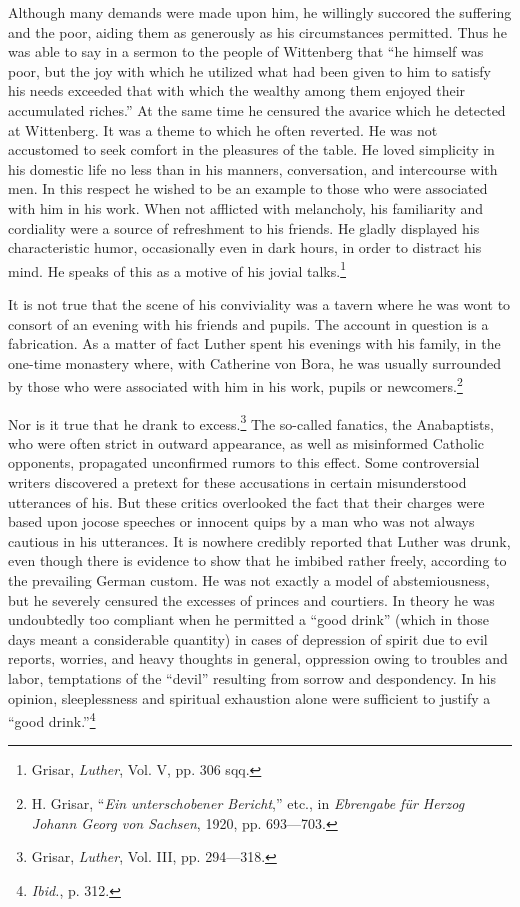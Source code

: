 Although many demands were made upon him, he willingly succored the suffering
and the poor, aiding them as generously as his
circumstances permitted. Thus he was able to say in a sermon to
the people of Wittenberg that “he himself was poor, but the joy
with which he utilized what had been given to him to satisfy his
needs exceeded that with which the wealthy among them enjoyed
their accumulated riches.” At the same time he censured the avarice
which he detected at Wittenberg. It was a theme to which he often
reverted. He was not accustomed to seek comfort in the pleasures
of the table. He loved simplicity in his domestic life no less than in
his manners, conversation, and intercourse with men. In this respect
he wished to be an example to those who were associated with him
in his work. When not afflicted with melancholy, his familiarity and
cordiality were a source of refreshment to his friends. He gladly displayed
his characteristic humor, occasionally even in dark hours, in
order to distract his mind. He speaks of this as a motive of his
jovial talks.\footnote{Grisar, \textit{Luther}, Vol. V, pp. 306 sqq.}

It is not true that the scene of his conviviality was a tavern where
he was wont to consort of an evening with his friends and pupils.
The account in question is a fabrication. As a matter of fact Luther
spent his evenings with his family, in the one-time monastery where,
with Catherine von Bora, he was usually surrounded by those who
were associated with him in his work, pupils or newcomers.\footnote
{H. Grisar, “\textit{Ein unterschobener Bericht},” etc., in \textit{Ebrengabe für Herzog Johann Georg
von Sachsen}, 1920, pp. 693—703.}

Nor is it true that he drank to excess.\footnote{Grisar, \textit{Luther}, Vol. III, pp. 294—318.}
 The so-called fanatics, the
Anabaptists, who were often strict in outward appearance, as well
as misinformed Catholic opponents, propagated unconfirmed rumors
to this effect. Some controversial writers discovered a pretext for
these accusations in certain misunderstood utterances of his. But
these critics overlooked the fact that their charges were based upon
jocose speeches or innocent quips by a man who was not always
cautious in his utterances. It is nowhere credibly reported that
Luther was drunk, even though there is evidence to show that he
imbibed rather freely, according to the prevailing German custom.
He was not exactly a model of abstemiousness, but he severely censured
the excesses of princes and courtiers. In theory he was undoubtedly
too compliant when he permitted a “good drink” (which
in those days meant a considerable quantity) in cases of depression
of spirit due to evil reports, worries, and heavy thoughts in general,
oppression owing to troubles and labor, temptations of the “devil”
resulting from sorrow and despondency. In his opinion, sleeplessness
and spiritual exhaustion alone were sufficient to justify a ``good
drink.''\footnote{\textit{Ibid.}, p. 312.}

